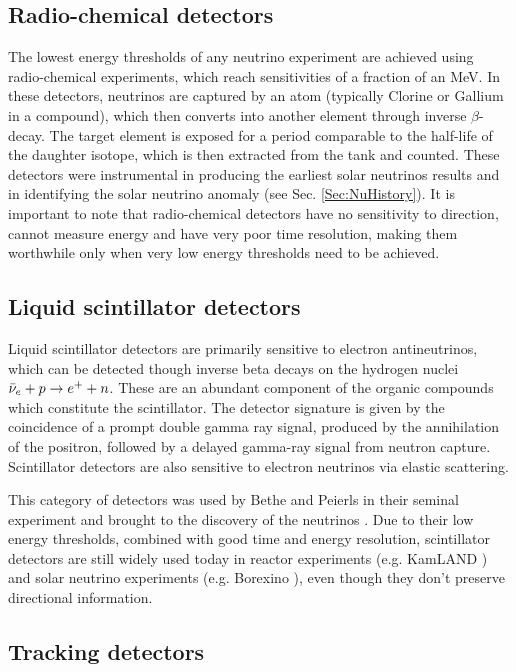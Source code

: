 \subsection{Radio-chemical detectors}
The lowest energy thresholds of any neutrino experiment are achieved using radio-chemical experiments, which reach sensitivities of a fraction of an MeV. In these detectors, neutrinos are captured by an atom (typically Clorine or Gallium in a compound), which then converts into another element through inverse $\beta$-decay. The target element is exposed for a period comparable  to the half-life of the daughter isotope, which is then extracted from the tank and counted. These detectors were instrumental in producing the earliest solar neutrinos results and in identifying the solar neutrino anomaly (see Sec. \ref{Sec:NuHistory}). It is important to note that radio-chemical detectors have no sensitivity to direction, cannot measure energy and have very poor time resolution, making them worthwhile only when very low energy thresholds need to be achieved.

\subsection{Liquid scintillator detectors}
Liquid scintillator detectors are primarily sensitive to electron antineutrinos, which can be detected though inverse beta decays on the hydrogen nuclei $\Bar{\nu}_e + p \rightarrow e^+ + n$. These are an abundant component of the organic compounds which constitute the scintillator. The detector signature is given by the coincidence of a prompt double gamma ray signal, produced by the annihilation of the positron, followed by a delayed gamma-ray signal from neutron capture. Scintillator detectors are also sensitive to electron neutrinos via elastic scattering. 

This category of detectors was used by Bethe and Peierls in their seminal experiment and brought to the discovery of the neutrinos \cite{Bethe:1934qn}. Due to their low energy thresholds, combined with good time and energy resolution, scintillator detectors are still widely used today in reactor experiments (e.g. KamLAND \cite{KamLAND:2002uet}) and solar neutrino experiments (e.g. Borexino \cite{Borexino:1998vpm}), even though they don't preserve directional information. 

\subsection{Tracking detectors}

